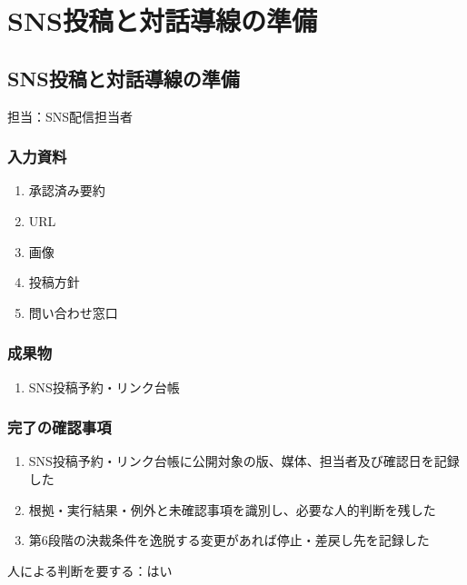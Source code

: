 \documentclass[a4paper,11pt]{article}
\begin{document}
\section{SNS投稿と対話導線の準備}
\subsection{SNS投稿と対話導線の準備}
\par 担当：SNS配信担当者\par\medskip
\subsubsection*{入力資料}
\begin{enumerate}[leftmargin=2em,itemsep=0.35em]
\item 承認済み要約
\item URL
\item 画像
\item 投稿方針
\item 問い合わせ窓口
\end{enumerate}
\subsubsection*{成果物}
\begin{enumerate}[leftmargin=2em,itemsep=0.35em]
\item SNS投稿予約・リンク台帳
\end{enumerate}
\subsubsection*{完了の確認事項}
\begin{enumerate}[leftmargin=2em,itemsep=0.35em]
\item SNS投稿予約・リンク台帳に公開対象の版、媒体、担当者及び確認日を記録した
\item 根拠・実行結果・例外と未確認事項を識別し、必要な人的判断を残した
\item 第6段階の決裁条件を逸脱する変更があれば停止・差戻し先を記録した
\end{enumerate}
\par 人による判断を要する：はい\par\medskip
\end{document}
